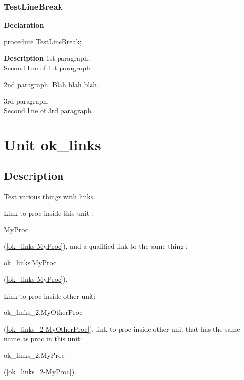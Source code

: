 \documentclass{report}
\begin{document}
\subsection*{TestLineBreak}
\begin{list}{}{
\setlength{\itemindent}{0cm}
\setlength{\listparindent}{0cm}
\setlength{\leftmargin}{\evensidemargin}
\addtolength{\leftmargin}{\tmplength}
\settowidth{\labelsep}{X}
\addtolength{\leftmargin}{\labelsep}
\setlength{\labelwidth}{\tmplength}
}
\begin{flushleft}
\item[\textbf{Declaration}\hfill]
\begin{ttfamily}
procedure TestLineBreak;\end{ttfamily}


\end{flushleft}
\par
\item[\textbf{Description}]
1st paragraph. \\{} Second line of 1st paragraph.

2nd paragraph. Blah blah blah.

3rd paragraph. \\{} Second line of 3rd paragraph.

\end{list}
\chapter{Unit ok{\_}links}
\section{Description}
Test various things with links.\hfill\vspace*{1ex}



Link to proc inside this unit : \begin{ttfamily}MyProc\end{ttfamily}(\ref{ok_links-MyProc}), and a qualified link to the same thing : \begin{ttfamily}ok{\_}links.MyProc\end{ttfamily}(\ref{ok_links-MyProc}).

Link to proc inside other unit: \begin{ttfamily}ok{\_}links{\_}2.MyOtherProc\end{ttfamily}(\ref{ok_links_2-MyOtherProc}), link to proc inside other unit that has the same name as proc in this unit: \begin{ttfamily}ok{\_}links{\_}2.MyProc\end{ttfamily}(\ref{ok_links_2-MyProc}).
\end{document}
